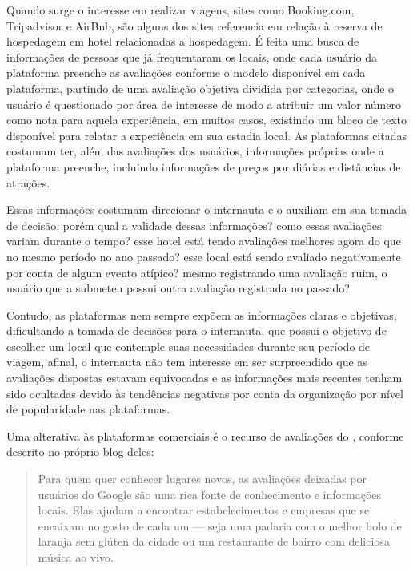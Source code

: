 Quando surge o interesse em realizar viagens, sites como Booking.com, Tripadvisor e AirBnb, são alguns dos sites referencia em relação à reserva de hospedagem em hotel  relacionadas a hospedagem. É feita uma busca de informações de pessoas que já frequentaram os locais, onde cada usuário da plataforma preenche as avaliações conforme o modelo disponível em cada plataforma, partindo de uma avaliação objetiva dividida por categorias, onde o usuário é questionado por área de interesse de modo a atribuir um valor número como nota para aquela experiência, em muitos casos, existindo um bloco de texto disponível para relatar a experiência em sua estadia local. As plataformas citadas costumam ter, além das avaliações dos usuários, informações próprias onde a plataforma preenche, incluindo informações de preços por diárias e distâncias de atrações.

Essas informações costumam direcionar o internauta e o auxiliam em sua tomada de decisão, porém qual a validade dessas informações? como essas avaliações variam durante o tempo? esse hotel está tendo avaliações melhores agora do que no mesmo período no ano passado? esse local está sendo avaliado negativamente por conta de algum evento atípico? mesmo registrando uma avaliação ruim, o usuário que a submeteu possui outra avaliação registrada no passado?

Contudo, as plataformas nem sempre expõem as informações claras e objetivas, dificultando a tomada de decisões para o internauta, que possui o objetivo de escolher um local que contemple suas necessidades durante seu período de viagem, afinal, o internauta não tem interesse em ser surpreendido que as avaliações dispostas estavam equivocadas e as informações mais recentes tenham sido ocultadas devido às tendências negativas por conta da organização por nível de popularidade nas plataformas.

Uma alterativa às plataformas comerciais é o recurso de avaliações do , conforme descrito no próprio blog deles:

\begin{quote}
    Para quem quer conhecer lugares novos, as avaliações deixadas por usuários do Google são uma rica fonte de conhecimento e informações locais. Elas ajudam a encontrar estabelecimentos e empresas que se encaixam no gosto de cada um — seja uma padaria com o melhor bolo de laranja sem glúten da cidade ou um restaurante de bairro com deliciosa música ao vivo.
\end{quote}

